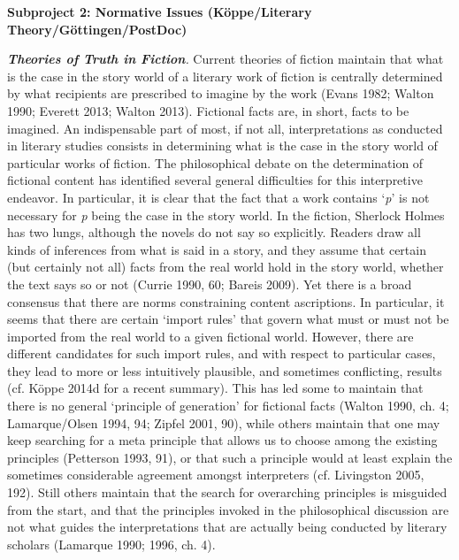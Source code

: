 
\vspace{.2cm}
\noindent\textbf{Subproject 2: Normative Issues (K\"oppe/Literary Theory/G\"ottingen/PostDoc)}
\vspace{.2cm}

\noindent\textbf{\emph{Theories of Truth in Fiction}}\emph{.} Current theories of fiction maintain that what is the case in the story world of a literary work of fiction is centrally determined by what recipients are prescribed to imagine by the work (Evans 1982; Walton 1990; Everett 2013; Walton 2013). Fictional facts are, in short, facts to be imagined. An indispensable part of most, if not all, interpretations as conducted in literary studies consists in determining what is the case in the story world of particular works of fiction. The philosophical debate on the determination of fictional content has identified several general difficulties for this interpretive endeavor. In particular, it is clear that the fact that a work contains `\emph{p}' is not necessary for \emph{p} being the case in the story world. In the fiction, Sherlock Holmes has two lungs, although the novels do not say so explicitly. Readers draw all kinds of inferences from what is said in a story, and they assume that certain (but certainly not all) facts from the real world hold in the story world, whether the text says so or not (Currie 1990, 60; Bareis 2009). Yet there is a broad consensus that there are norms constraining content ascriptions. In particular, it seems that there are certain `import rules' that govern what must or must not be imported from the real world to a given fictional world. However, there are different candidates for such import rules, and with respect to particular cases, they lead to more or less intuitively plausible, and sometimes conflicting, results (cf. K\"oppe 2014d for a recent summary). This has led some to maintain that there is no general `principle of generation' for fictional facts (Walton 1990, ch. 4; Lamarque/Olsen 1994, 94; Zipfel 2001, 90), while others maintain that one may keep searching for a meta principle that allows us to choose among the existing principles (Petterson 1993, 91), or that such a principle would at least explain the sometimes considerable agreement amongst interpreters (cf. Livingston 2005, 192). Still others maintain that the search for overarching principles is misguided from the start, and that the principles invoked in the philosophical discussion are not what guides the interpretations that are actually being conducted by literary scholars (Lamarque 1990; 1996, ch. 4).

